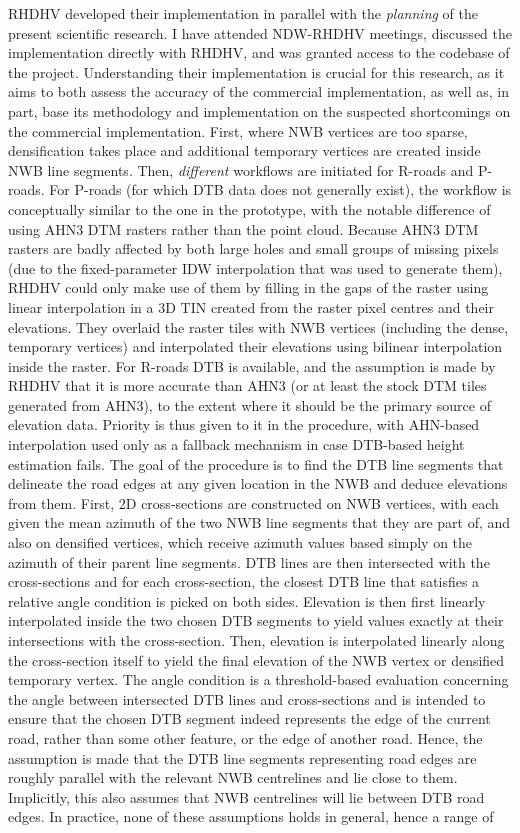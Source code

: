 RHDHV developed their implementation in parallel with the \textit{planning} of the present scientific research. I have attended NDW-RHDHV meetings, discussed the implementation directly with RHDHV, and was granted access to the codebase of the project. Understanding their implementation is crucial for this research, as it aims to both assess the accuracy of the commercial implementation, as well as, in part, base its methodology and implementation on the suspected shortcomings on the commercial implementation. First, where NWB vertices are too sparse, densification takes place and additional temporary vertices are created inside NWB line segments. Then, \textit{different} workflows are initiated for R-roads and P-roads. For P-roads (for which DTB data does not generally exist), the workflow is conceptually similar to the one in the prototype, with the notable difference of using AHN3 DTM rasters rather than the point cloud. Because AHN3 DTM rasters are badly affected by both large holes and small groups of missing pixels (due to the fixed-parameter IDW interpolation that was used to generate them), RHDHV could only make use of them by filling in the gaps of the raster using linear interpolation in a 3D TIN created from the raster pixel centres and their elevations. They overlaid the raster tiles with NWB vertices (including the dense, temporary vertices) and interpolated their elevations using bilinear interpolation inside the raster. For R-roads DTB is available, and the assumption is made by RHDHV that it is more accurate than AHN3 (or at least the stock DTM tiles generated from AHN3), to the extent where it should be the primary source of elevation data. Priority is thus given to it in the procedure, with AHN-based interpolation used only as a fallback mechanism in case DTB-based height estimation fails. The goal of the procedure is to find the DTB line segments that delineate the road edges at any given location in the NWB and deduce elevations from them. First, 2D cross-sections are constructed on NWB vertices, with each given the mean azimuth of the two NWB line segments that they are part of, and also on densified vertices, which receive azimuth values based simply on the azimuth of their parent line segments. DTB lines are then intersected with the cross-sections and for each cross-section, the closest DTB line that satisfies a relative angle condition is picked on both sides. Elevation is then first linearly interpolated inside the two chosen DTB segments to yield values exactly at their intersections with the cross-section. Then, elevation is interpolated linearly along the cross-section itself to yield the final elevation of the NWB vertex or densified temporary vertex. The angle condition is a threshold-based evaluation concerning the angle between intersected DTB lines and cross-sections and is intended to ensure that the chosen DTB segment indeed represents the edge of the current road, rather than some other feature, or the edge of another road. Hence, the assumption is made that the DTB line segments representing road edges are roughly parallel with the relevant NWB centrelines and lie close to them. Implicitly, this also assumes that NWB centrelines will lie between DTB road edges. In practice, none of these assumptions holds in general, hence a range of 